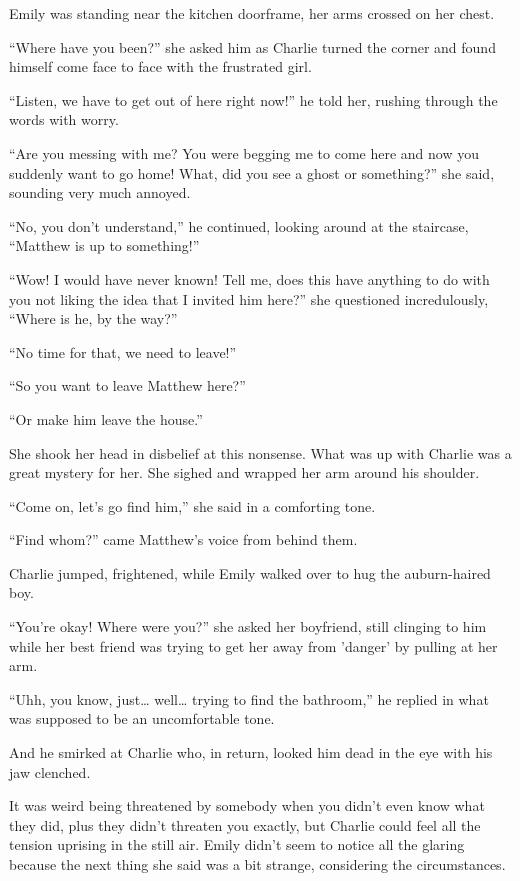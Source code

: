 Emily was standing near the kitchen doorframe, her arms crossed on her chest.

“Where have you been?” she asked him as Charlie turned the corner and found himself come face to face with the frustrated girl.

“Listen, we have to get out of here right now!” he told her, rushing through the words with worry.

“Are you messing with me? You were begging me to come here and now you suddenly want to go home! What, did you see a ghost or something?” she said, sounding very much annoyed.

“No, you don't understand,” he continued, looking around at the staircase, “Matthew is up to something!”

“Wow! I would have never known! Tell me, does this have anything to do with you not liking the idea that I invited him here?” she questioned incredulously, “Where is he, by the way?”

“No time for that, we need to leave!”

“So you want to leave Matthew here?”

“Or make him leave the house.”

She shook her head in disbelief at this nonsense. What was up with Charlie was a great mystery for her. She sighed and wrapped her arm around his shoulder.

“Come on, let's go find him,” she said in a comforting tone.

“Find whom?” came Matthew's voice from behind them.

Charlie jumped, frightened, while Emily walked over to hug the auburn-haired boy.

“You're okay! Where were you?” she asked her boyfriend, still clinging to him while her best friend was trying to get her away from 'danger' by pulling at her arm.

“Uhh, you know, just… well… trying to find the bathroom,” he replied in what was supposed to be an uncomfortable tone.

And he smirked at Charlie who, in return, looked him dead in the eye with his jaw clenched.

It was weird being threatened by somebody when you didn't even know what they did, plus they didn't threaten you exactly, but Charlie could feel all the tension uprising in the still air. Emily didn't seem to notice all the glaring because the next thing she said was a bit strange, considering the circumstances.

